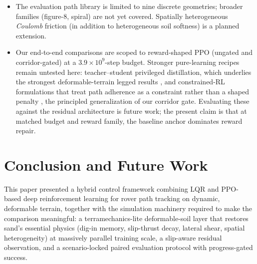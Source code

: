 \documentclass[conference]{IEEEtran}
\begin{document}
\begin{itemize}
\item The evaluation path library is limited to nine discrete geometries; broader families (figure-8, spiral) are not yet covered. Spatially heterogeneous \emph{Coulomb} friction (in addition to heterogeneous soil softness) is a planned extension.
\item Our end-to-end comparisons are scoped to reward-shaped PPO (ungated and corridor-gated) at a $3.9\times10^9$-step budget. Stronger pure-learning recipes remain untested here: teacher--student privileged distillation, which underlies the strongest deformable-terrain legged results \cite{lee2020learning, choi2023deformable}, and constrained-RL formulations that treat path adherence as a constraint rather than a shaped penalty \cite{achiam2017cpo}, the principled generalization of our corridor gate. Evaluating these against the residual architecture is future work; the present claim is that at matched budget and reward family, the baseline anchor dominates reward repair.
\end{itemize}

\section{Conclusion and Future Work}
This paper presented a hybrid control framework combining LQR and PPO-based deep reinforcement learning for rover path tracking on dynamic, deformable terrain, together with the simulation machinery required to make the comparison meaningful: a terramechanics-lite deformable-soil layer that restores sand's essential physics (dig-in memory, slip-thrust decay, lateral shear, spatial heterogeneity) at massively parallel training scale, a slip-aware residual observation, and a scenario-locked paired evaluation protocol with progress-gated success.
\end{document}
